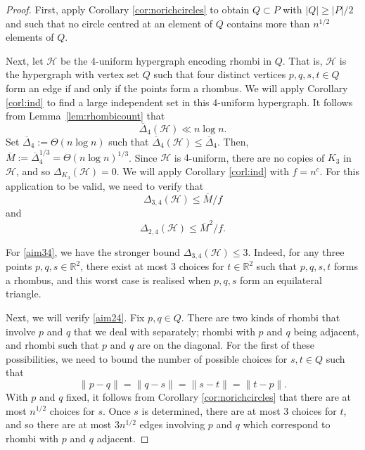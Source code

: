 \documentclass[11pt,oneside]{amsart}
\newcommand{\cH}{\mathcal{H}}
\numberwithin{exercise}{subsection}
\begin{document}
\begin{proof} First, apply Corollary \ref{cor:norichcircles} to obtain $Q \subset P$ with $|Q| \geq |P|/2$ and such that no circle centred at an element of $Q$ contains more than $n^{1/2}$ elements of $Q$.

Next, let $\mathcal H$ be the $4$-uniform hypergraph encoding rhombi in $Q$. That is, $\mathcal H$ is the hypergraph with vertex set $Q$ such that four distinct vertices $p,q,s,t \in Q$ form an edge if and only if the points form a rhombus. We will apply Corollary \ref{corl:ind} to find a large independent set in this 4-uniform hypergraph. It follows from Lemma~\ref{lem:rhombicount} that 
\[
\overline{\Delta}_4(\mathcal{H}) \ll n \log n.
\]
Set $\overline{\Delta}_4:=\Theta(n \log n)$ such that $\overline{\Delta}_4(\mathcal{H})\leq \overline{\Delta}_4$. Then, $\overline M:= \overline \Delta_4^{1/3}=\Theta(n \log n)^{1/3}$. 
Since $\mathcal H$ is $4$-uniform, there are no copies of $K_3$ in $\mathcal H$, and so $\Delta_{K_3}(\mathcal{H})=0$.  
We will apply Corollary \ref{corl:ind} with $f=n^c$. For this application to be valid, we need to verify that
\begin{equation} \label{aim34}
    \Delta_{3,4}(\cH) \leq \overline M/f
\end{equation}
and
\begin{equation} \label{aim24}
    \Delta_{2,4}(\cH) \leq \overline M^2/f.
\end{equation}

For \eqref{aim34}, we have the stronger bound $\Delta_{3,4}(\cH) \leq 3$. Indeed, for any three points $p,q,s \in \mathbb R^2$, there exist at most $3$ choices for $t \in \mathbb R^2$ such that $p,q,s,t$ forms a rhombus, and this worst case is realised when $p,q,s$ form an equilateral triangle.

Next, we will verify \eqref{aim24}. Fix $p,q \in Q$. There are two kinds of rhombi that involve $p$ and $q$ that we deal with separately; rhombi with $p$ and $q$ being adjacent, and rhombi such that $p$ and $q$ are on the diagonal. For the first of these possibilities, we need to bound the number of possible choices for $s,t \in Q$ such that
\[
\|p-q\|=\|q-s\|=\|s-t\|=\|t-p\|.
\]
With $p$ and $q$ fixed, it follows from Corollary \ref{cor:norichcircles} that there are at most $n^{1/2}$ choices for $s$. Once $s$ is determined, there are at most $3$ choices for $t$, and so there are at most $3n^{1/2}$ edges involving $p$ and $q$ which correspond to rhombi with $p$ and $q$ adjacent.


\end{proof}
\end{document}
